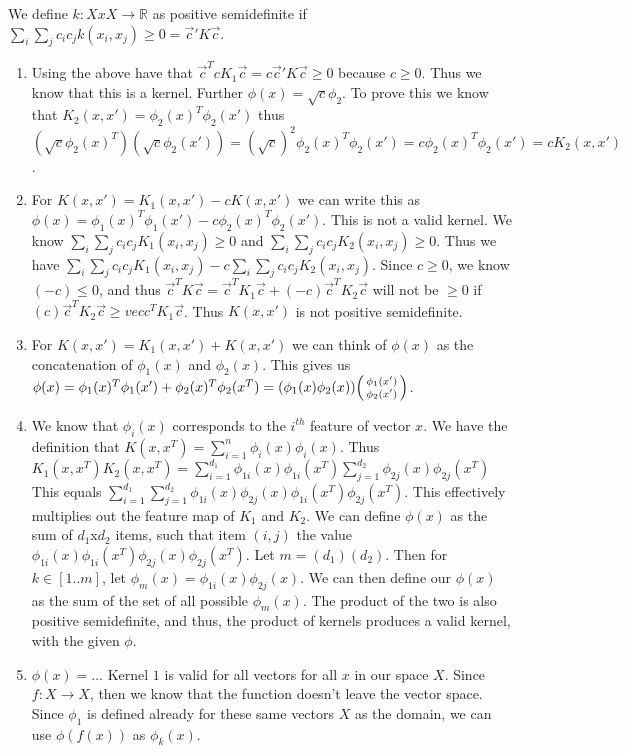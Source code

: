 \documentclass[english]{article}
\begin{document}
We define $k: X x X \rightarrow \mathbb{R}$ as positive semidefinite if $\sum_{i} \sum_{j} c_i c_j k(x_i, x_j) \geq 0  = \vec{c}'K\vec{c}$.
\begin{enumerate}
\item Using the above have that $\vec{c}^TcK_1\vec{c} = c \vec{c}'K\vec{c} \geq 0$ because $c \geq 0$. Thus we know that this is a kernel. Further $\phi(x) = \sqrt{c}\phi_2$. To prove this we know that $K_2(x,x') = \phi_2(x)^T\phi_2(x')$ thus  $(\sqrt{c}\phi_2(x)^T)(\sqrt{c}\phi_2(x')) = (\sqrt{c})^2 \phi_2(x)^T\phi_2(x') = c  \phi_2(x)^T\phi_2(x') = cK_2(x,x')$. 
\item For $K(x,x') = K_1(x,x') - cK(x,x')$ we can write this as $\phi(x) = \phi_1(x)^T\phi_1(x') - c\phi_2(x)^T\phi_2(x')$. This is not a valid kernel. We know $\sum_{i} \sum_{j} c_i c_j K_1(x_i, x_j) \geq 0$ and $\sum_{i} \sum_{j} c_i c_j K_2(x_i, x_j) \geq 0$. Thus we have $\sum_{i} \sum_{j} c_i c_j K_1(x_i, x_j) - c\sum_{i} \sum_{j} c_i c_j K_2(x_i, x_j)$. Since $c \geq 0$, we know $(-c) \leq 0$, and thus $\vec{c}^TK\vec{c} = \vec{c}^TK_1\vec{c} + (-c)\vec{c}^TK_2\vec{c}$ will not be $\geq 0$ if $(c)\vec{c}^TK_2\vec{c} \geq vec{c}^TK_1\vec{c}$. Thus $K(x, x')$ is not positive semidefinite. 
\item For $K(x,x') = K_1(x,x')  + K(x,x')$ we can think of $\phi(x)$ as the concatenation of $\phi_1(x)$ and $\phi_2(x)$. This gives us $\phi(x) = \phi_1(x)^T\phi_1(x') + \phi_2(x)^T\phi_2(x^T) = (\phi_1(x)\phi_2(x))\begin{psmallmatrix}\phi_1(x')\\\phi_2(x')\end{psmallmatrix}$. 
\item We know that $\phi_i(x)$ corresponds to the $i^{th}$ feature of vector $x$. We have the definition that $K(x,x^T) = \sum_{i=1}^{n} \phi_i(x)\phi_i(x
)$. Thus $K_1(x, x^T)K_2(x, x^T) = \sum_{i=1}^{d_1} \phi_{1i}(x)\phi_{1i}(x^T)\sum_{j=1}^{d_2}\phi_{2j}(x)\phi_{2j}(x^T)$ This equals $\sum_{i=1}^{d_1} \sum_{j=1}^{d_2} \phi_{1i}(x)\phi_{2j}(x)\phi_{1i}(x^T)\phi_{2j}(x^T)$. This effectively multiplies out the feature map of $K_1$ and $K_2$. We can define $\phi(x)$ as the sum of $d_1$x$d_2$ items, such that item $(i, j)$ the value $\phi_{1i}(x)\phi_{1i}(x^T)\phi_{2j}(x)\phi_{2j}(x^T)$. Let $m = (d_1)(d_2)$. Then for $k \in [1..m]$, let $\phi_m(x) = \phi_{1i}(x)\phi_{2j}(x)$. We can then define our $\phi(x)$ as the sum of the set of all possible $\phi_m(x)$. The product of the two is also positive semidefinite, and thus, the product of kernels produces a valid kernel, with the given $\phi$. 
\item $\phi(x) = ...$ Kernel $1$ is valid for all vectors for all $x$ in our space $X$. Since $f: X \rightarrow X$, then we know that the function doesn't leave the vector space. Since $\phi_1$ is defined already for these same vectors $X$ as the domain, we can use $\phi(f(x))$ as $\phi_k(x)$.
\end{enumerate}
\end{document}
